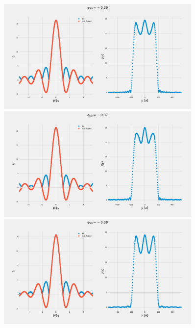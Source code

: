 \documentclass[a4paper]{article}
\begin{document}
\begin{figure}
	\includegraphics[width=0.9\textwidth]{figs/wg32double/current_and_density_036}
	\includegraphics[width=0.9\textwidth]{figs/wg32double/current_and_density_037}
	\includegraphics[width=0.9\textwidth]{figs/wg32double/current_and_density_038}
\end{figure}	
\end{document}
